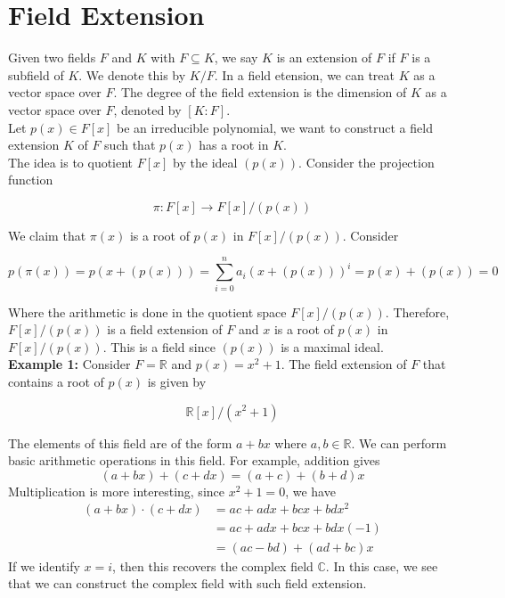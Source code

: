 \documentclass[11pt]{article}
\begin{document}
\section{Field Extension}

Given two fields $F$ and $K$ with $F \subseteq K$, we say $K$ is an extension of $F$ if $F$ is a subfield of $K$. We denote this by $K/F$. In a field etension, we can treat $K$ as a vector space over $F$. The degree of the field extension is the dimension of $K$ as a vector space over $F$, denoted by $[K:F]$. \\

Let $p(x)\in F[x]$ be an irreducible polynomial, we want to construct a field extension $K$ of $F$ such that $p(x)$ has a root in $K$.\\

The idea is to quotient $F[x]$ by the ideal $(p(x))$. Consider the projection function 

\[\pi: F[x] \to F[x]/(p(x))\]

We claim that $\pi(x)$ is a root of $p(x)$ in $F[x]/(p(x))$. Consider 

\[p(\pi(x)) = p(x+ (p(x))) = \sum_{i=0}^n a_i (x+(p(x)))^i = p(x) + (p(x)) = 0\]

Where the arithmetic is done in the quotient space $F[x]/(p(x))$. Therefore, $F[x]/(p(x))$ is a field extension of $F$ and $x$ is a root of $p(x)$ in $F[x]/(p(x))$. This is a field since $(p(x))$ is a maximal ideal.\\

\textbf{Example 1:} Consider $F=\mathbb{R}$ and $p(x)=x^2+1$. The field extension of $F$ that contains a root of $p(x)$ is given by 

\[\mathbb{R}[x]/(x^2+1)\]

The elements of this field are of the form $a+bx$ where $a, b \in \mathbb{R}$. We can perform basic arithmetic operations in this field. For example, addition gives
\[(a+bx) + (c+dx) = (a+c) + (b+d)x\]
Multiplication is more interesting, since $x^2+1=0$, we have
\begin{align*}
  (a+bx) \cdot (c+dx) &= ac + adx + bcx + bdx^2 \\
  &= ac + adx + bcx + bdx(-1) \\
  &= (ac-bd) + (ad+bc)x
\end{align*}
If we identify $x=i$, then this recovers the complex field $\mathbb{C}$. In this case, we see that we can construct the complex field with such field extension. \\
\end{document}
